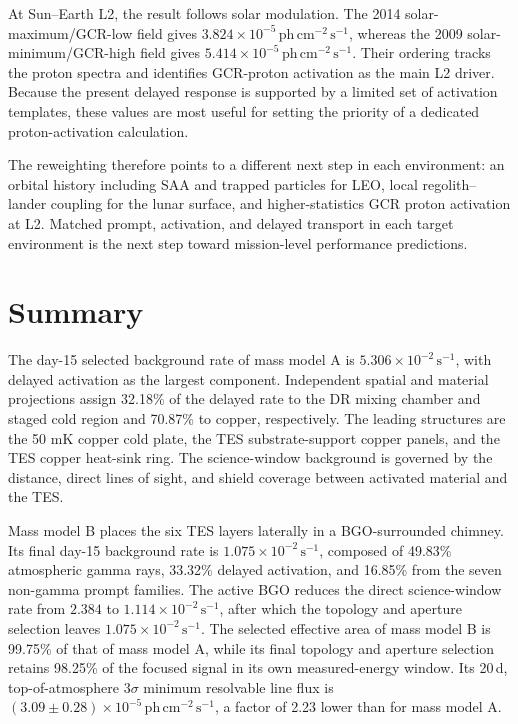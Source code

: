 \documentclass[11pt]{article}
\newcommand{\phcms}{\ensuremath{\,\mathrm{ph\,cm^{-2}\,s^{-1}}}}
\newcommand{\cps}{\ensuremath{\,\mathrm{s^{-1}}}}
\begin{document}
At Sun--Earth L2, the result follows solar modulation. The 2014
solar-maximum/GCR-low field gives $3.824\times10^{-5}\phcms$, whereas the 2009
solar-minimum/GCR-high field gives $5.414\times10^{-5}\phcms$. Their ordering
tracks the proton spectra and identifies GCR-proton activation as the main L2
driver. Because the present delayed response is supported by a limited set of
activation templates, these values are most useful for setting the priority of
a dedicated proton-activation calculation.

The reweighting therefore points to a different next step in each environment:
an orbital history including SAA and trapped particles for LEO, local
regolith--lander coupling for the lunar surface, and higher-statistics GCR
proton activation at L2. Matched prompt, activation, and delayed transport in
each target environment is the next step toward mission-level performance
predictions.

\FloatBarrier

\section{Summary}
\label{sec:summary}

The day-15 selected background rate of mass model A is
$5.306\times10^{-2}\cps$, with delayed activation as the largest component.
Independent spatial and material projections assign 32.18\% of the delayed
rate to the DR mixing chamber and staged cold region and 70.87\% to copper,
respectively. The leading structures are the
50 mK copper cold plate, the TES substrate-support copper panels, and the TES
copper heat-sink ring. The science-window background is governed by the
distance, direct lines of sight, and shield coverage between activated material
and the TES.

Mass model B places the six TES layers laterally in a BGO-surrounded chimney.
Its final day-15 background rate is $1.075\times10^{-2}\cps$, composed of
49.83\% atmospheric gamma rays, 33.32\% delayed activation, and
16.85\% from the seven non-gamma prompt families. The active BGO reduces the
direct science-window rate from $2.384$ to
$1.114\times10^{-2}\cps$, after which the topology and aperture selection
leaves $1.075\times10^{-2}\cps$. The selected effective area of mass model B
is 99.75\% of that of mass model A, while its final topology and aperture
selection retains 98.25\% of the focused signal in its own measured-energy
window. Its 20\,d, top-of-atmosphere $3\sigma$ minimum resolvable line flux is
$(3.09\pm0.28)\times10^{-5}\phcms$, a factor of 2.23 lower than for mass
model A.
\end{document}
